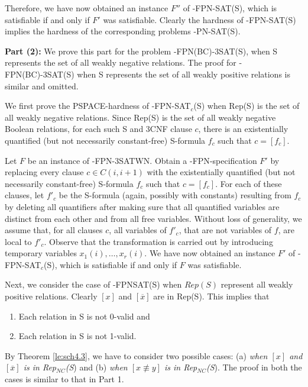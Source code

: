 Therefore, we have now obtained an instance $F''$ 
of {-FPN-SAT(S)}, which is satisfiable
if and only if $F'$ was satisfiable. Clearly the hardness of
{-FPN-SAT(S)} implies the hardness of the corresponding problems 
{-PN-SAT(S)}.


\noindent
{\bf Part (2): }
We prove  this part for the problem {-FPN(BC)-3SAT(S)}, when 
{\sf S} represents the set of all weakly negative relations.
The proof for {-FPN(BC)-3SAT(S)} when {\sf S} represents 
the set of all weakly positive relations is similar and omitted.

We first prove the {\sf PSPACE}-hardness of {-FPN-SAT$_c$(S)}
when {\sf Rep(S)} is the set of all weakly negative relations.
Since {\sf Rep(S)} is the set of all weakly negative  Boolean relations,
for each such {\sf S} and {\sf 3CNF} clause $c$,
there is an existentially quantified (but not necessarily constant-free)
{\sf S}-formula $f_c$ such that $c=[f_c]$. 

Let $F$ be an instance of {-FPN-3SATWN}. 
Obtain a {-FPN}-specification $F'$ 
by replacing every clause $c \in C(i, i+1)$ with the 
existentially quantified (but not necessarily constant-free)
{\sf S}-formula $f_c$ such that $c=[f_c]$. For each of these clauses,
let $f'_c$ be the {\sf S}-formula (again, possibly with
constants) resulting from $f_{c}$ by deleting
all quantifiers after making sure that all quantified variables are
distinct from each other and from all free variables.  Without loss of
generality, we assume that, for all clauses $c$,
all variables of $f'_c$, that are not variables
of $f$, are local to $f'_c$.
Observe that the transformation is carried out by introducing temporary
variables $x_1(i), \ldots, x_r(i)$.
We have now obtained an instance $F'$ of {-FPN-SAT$_c$(S)}, 
which is satisfiable if and only if $F$ was satisfiable. 

Next, we consider the case  of {-FPNSAT(S)} when $Rep(S)$ 
represent all weakly positive relations. 
Clearly $[x]$ and $[\overline{x}]$  are in {\sf Rep(S)}.
This implies that 
\begin{enumerate}
\item
Each relation in {\sf S} is not 0-valid and

\item
Each relation in {\sf S} is not 1-valid.
\end{enumerate}
By Theorem \ref{le:sch4.3}, we have to consider two possible cases:
(a) {\em when $[x]$ and $[\overline{x}]$ is in {\sf Rep}$_{NC}$({\sf S}}) and
(b) {\em when $[x \not\equiv y ]$  is in {\sf Rep}$_{NC}$({\sf S}}).
The proof in both the cases is similar to that in Part 1. \hfill\QED

